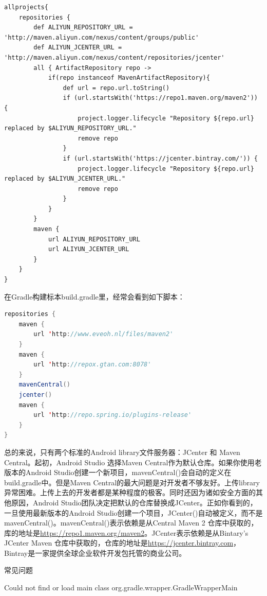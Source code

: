 \documentclass[12pt]{book}
\makeatletter
\numberwithin{dummy}{section}
\theoremstyle{ocrenumbox}
\theoremstyle{blacknumex}
\theoremstyle{blacknumbox}
\theoremstyle{ocrenum}
\renewcommand{\subsection}{\@startsection {subsection}{2}{\z@}
	{-3ex \@plus -0.1ex \@minus -.4ex}
	{0.5ex \@plus.2ex }
	{\normalfont\sffamily\bfseries}}
\renewcommand\paragraph{\@startsection{paragraph}{4}{\z@}
	{-2ex \@plus-.2ex \@minus .2ex}
	{.1ex}
	{\normalfont\small\sffamily\bfseries}}
\makeatother
\begin{document}
\begin{lstlisting}
allprojects{
	repositories {
		def ALIYUN_REPOSITORY_URL = 'http://maven.aliyun.com/nexus/content/groups/public'
		def ALIYUN_JCENTER_URL = 'http://maven.aliyun.com/nexus/content/repositories/jcenter'
		all { ArtifactRepository repo ->
			if(repo instanceof MavenArtifactRepository){
				def url = repo.url.toString()
				if (url.startsWith('https://repo1.maven.org/maven2')) {
					project.logger.lifecycle "Repository ${repo.url} replaced by $ALIYUN_REPOSITORY_URL."
					remove repo
				}
				if (url.startsWith('https://jcenter.bintray.com/')) {
					project.logger.lifecycle "Repository ${repo.url} replaced by $ALIYUN_JCENTER_URL."
					remove repo
				}
			}
		}
		maven {
			url ALIYUN_REPOSITORY_URL
			url ALIYUN_JCENTER_URL
		}
	}
}
\end{lstlisting}

在Gradle构建标本build.gradle里，经常会看到如下脚本：

\begin{lstlisting}[language=Java]
repositories {
	maven {
		url 'http://www.eveoh.nl/files/maven2'
	}
	maven {
		url 'http://repox.gtan.com:8078'
	}
	mavenCentral()
	jcenter()
	maven { 
		url 'http://repo.spring.io/plugins-release' 
	}
}
\end{lstlisting}

总的来说，只有两个标准的Android library文件服务器：JCenter 和 Maven Central。起初，Android Studio 选择Maven Central作为默认仓库。如果你使用老版本的Android Studio创建一个新项目，mavenCentral()会自动的定义在build.gradle中。但是Maven Central的最大问题是对开发者不够友好。上传library异常困难。上传上去的开发者都是某种程度的极客。同时还因为诸如安全方面的其他原因，Android Studio团队决定把默认的仓库替换成JCenter。正如你看到的，一旦使用最新版本的Android Studio创建一个项目，JCenter()自动被定义，而不是mavenCentral()。mavenCentral()表示依赖是从Central Maven 2 仓库中获取的，库的地址是\url{https://repo1.maven.org/maven2}。JCenter表示依赖是从Bintary’s JCenter Maven 仓库中获取的，仓库的地址是\url{https://jcenter.bintray.com}，Bintray是一家提供全球企业软件开发包托管的商业公司。

\subsection{常见问题}

\paragraph{Could not find or load main class org.gradle.wrapper.GradleWrapperMain}
\end{document}
